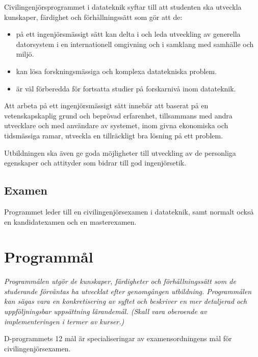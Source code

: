 \documentclass[twocolumn]{article}
\newcommand{\meta}[1]{{\small \emph{#1}}}
\begin{document}
Civilingenjörsprogrammet i datateknik syftar till att studenten ska
utveckla kunskaper, färdighet och förhållningssätt som gör att de:
\begin{itemize}
\item på ett ingenjörsmässigt sätt kan delta i och leda utveckling av
  generella datorsystem i en internationell omgivning och i samklang
  med samhälle och miljö.
\item kan lösa forskningsmässiga och komplexa datatekniska problem.
\item är väl förberedda för fortsatta studier på forskarnivå inom
  datateknik.
\end{itemize}
Att arbeta på ett ingenjörsmässigt sätt innebär att
baserat på en vetenskapskaplig grund och beprövad erfarenhet,
tillsammans med andra utvecklare och med användare av systemet,
inom givna ekonomiska och tidsmässiga ramar,
utveckla en tillräckligt bra lösning på ett problem.

Utbildningen ska även ge goda möjligheter till utveckling av de
personliga egenskaper och attityder som bidrar till god ingenjörsetik.

\subsection{Examen}

Programmet leder till en civilingenjörsexamen i datateknik, samt
normalt också en kandidat\-examen och en masterexamen.

\section{Programmål}
\meta{Programmålen utgör de kunskaper, färdigheter och
  förhållningssätt som de studerande förväntas ha utvecklat efter
  genomgången utbildning. Programmålen kan sägas vara en
  konkretisering av syftet och beskriver en mer detaljerad och
  uppföljningsbar uppsättning lärandemål. (Skall vara oberoende av
  implementeringen i termer av kurser.)}

D-programmets 12 mål är specialiseringar av examensordningens mål för
civilingenjörsexamen.
\end{document}
